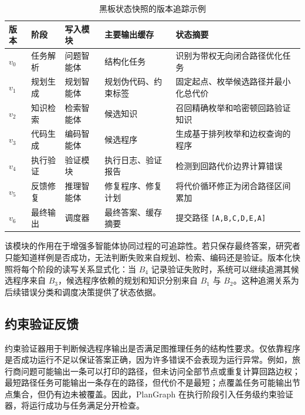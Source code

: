 \begin{table}[htbp]
\centering
\small
\caption{黑板状态快照的版本追踪示例}
\label{tab:blackboard_snapshot_example}
\renewcommand{\arraystretch}{1.12}
\begin{tabularx}{\textwidth}{
>{\centering\arraybackslash}p{0.8cm}
>{\raggedright\arraybackslash}p{2.4cm}
>{\raggedright\arraybackslash}p{2.2cm}
>{\raggedright\arraybackslash}p{3.2cm}
>{\raggedright\arraybackslash}X}
\toprule
版本 & 阶段 & 写入模块 & 主要输出缓存 & 状态摘要 \\
\midrule
$v_0$ & 任务解析 & 问题智能体 & 结构化任务 & 识别为带权无向闭合路径优化任务 \\
$v_1$ & 规划生成 & 规划智能体 & 规划伪代码、约束标签 & 固定起点、枚举候选路径并最小化总代价 \\
$v_2$ & 知识检索 & 检索智能体 & 候选知识 & 召回精确枚举和哈密顿回路验证知识 \\
$v_3$ & 代码生成 & 编码智能体 & 候选程序 & 生成基于排列枚举和边权查询的程序 \\
$v_4$ & 执行验证 & 验证模块 & 执行日志、验证报告 & 检测到回路代价边界计算错误 \\
$v_5$ & 反馈修复 & 推理智能体 & 修复程序、修复计划 & 将代价循环修正为闭合路径区间累加 \\
$v_6$ & 最终输出 & 调度器 & 最终答案、缓存摘要 & 提交路径 \texttt{[A,B,C,D,E,A]} \\
\bottomrule
\end{tabularx}
\end{table}

该模块的作用在于增强多智能体协同过程的可追踪性。若只保存最终答案，研究者只能知道样例是否成功，无法判断失败来自规划、检索、编码还是验证。版本化快照将每个阶段的读写关系显式化：当 $B_4$ 记录验证失败时，系统可以继续追溯其候选程序来自 $B_3$，候选程序依赖的规划和知识分别来自 $B_1$ 与 $B_2$。这种追溯关系为后续错误分类和调度决策提供了状态依据。

\subsection{约束验证反馈}

约束验证器用于判断候选程序输出是否满足图推理任务的结构性要求。仅依靠程序是否成功运行不足以保证答案正确，因为许多错误不会表现为运行异常。例如，旅行商问题可能输出一条可以打印的路径，但未访问全部节点或重复计算回路边权；最短路径任务可能输出一条存在的路径，但代价不是最短；点覆盖任务可能输出节点集合，但仍有边未被覆盖。因此，PlanGraph 在执行阶段引入任务级约束验证器，将运行成功与任务满足分开检查。

